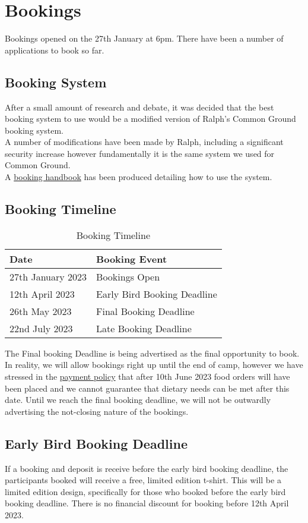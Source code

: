 \chapter{Bookings}
Bookings opened on the 27th January at 6pm. There have been a number of applications to book so far.

\section{Booking System}
After a small amount of research and debate, it was decided that the best booking system to use would be a modified version of Ralph's Common Ground booking system.\\

A number of modifications have been made by Ralph, including a significant security increase however fundamentally it is the same system we used for Common Ground.\\

A \href{https://venturercamp.org.uk/wp-content/uploads/2023/01/booking-handbook-v1.pdf}{booking handbook} has been produced detailing how to use the system. 

\section{Booking Timeline}
\begin{table}[H]
    \begin{tabularx}{\textwidth}{XX}
        \textbf{Date} & \textbf{Booking Event}\\
        \hline
        \hline
        27th January 2023 & Bookings Open\\
        \hline
        12th April 2023 & Early Bird Booking Deadline\\
        \hline
        26th May 2023 & Final Booking Deadline\\
        \hline
        22nd July 2023 & Late Booking Deadline\\
        \hline
    \end{tabularx}
    \caption{Booking Timeline}
\end{table}
The Final booking Deadline is being advertised as the final opportunity to book. In reality, we will allow bookings right up until the end of camp, however we have stressed in the \href{https://venturercamp.org.uk/wp-content/uploads/2023/01/payment-policy-v1.pdf}{payment policy} that after 10th June 2023 food orders will have been placed and we cannot guarantee that dietary needs can be met after this date. Until we reach the final booking deadline, we will not be outwardly advertising the not-closing nature of the bookings. 

\section{Early Bird Booking Deadline}
If a booking and deposit is receive before the early bird booking deadline, the participants booked will receive a free, limited edition t-shirt. This will be a limited edition design, specifically for those who booked before the early bird booking deadline. There is no financial discount for booking before 12th April 2023.